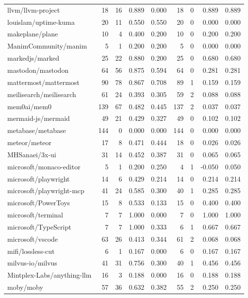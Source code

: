 \begin{tabular}{lrrrrrrrr}
llvm/llvm-project & 18 & 16 & 0.889 & 0.000 & 18 & 0 & 0.889 & 0.889 \\
louislam/uptime-kuma & 20 & 11 & 0.550 & 0.550 & 20 & 0 & 0.000 & 0.000 \\
makeplane/plane & 10 & 4 & 0.400 & 0.200 & 10 & 0 & 0.200 & 0.200 \\
ManimCommunity/manim & 5 & 1 & 0.200 & 0.200 & 5 & 0 & 0.000 & 0.000 \\
markedjs/marked & 25 & 22 & 0.880 & 0.200 & 25 & 0 & 0.680 & 0.680 \\
mastodon/mastodon & 64 & 56 & 0.875 & 0.594 & 64 & 0 & 0.281 & 0.281 \\
mattermost/mattermost & 90 & 78 & 0.867 & 0.708 & 89 & 1 & 0.159 & 0.159 \\
meilisearch/meilisearch & 61 & 24 & 0.393 & 0.305 & 59 & 2 & 0.088 & 0.088 \\
mem0ai/mem0 & 139 & 67 & 0.482 & 0.445 & 137 & 2 & 0.037 & 0.037 \\
mermaid-js/mermaid & 49 & 21 & 0.429 & 0.327 & 49 & 0 & 0.102 & 0.102 \\
metabase/metabase & 144 & 0 & 0.000 & 0.000 & 144 & 0 & 0.000 & 0.000 \\
meteor/meteor & 17 & 8 & 0.471 & 0.444 & 18 & 0 & 0.026 & 0.026 \\
MHSanaei/3x-ui & 31 & 14 & 0.452 & 0.387 & 31 & 0 & 0.065 & 0.065 \\
microsoft/monaco-editor & 5 & 1 & 0.200 & 0.250 & 4 & 1 & -0.050 & 0.050 \\
microsoft/playwright & 14 & 6 & 0.429 & 0.214 & 14 & 0 & 0.214 & 0.214 \\
microsoft/playwright-mcp & 41 & 24 & 0.585 & 0.300 & 40 & 1 & 0.285 & 0.285 \\
microsoft/PowerToys & 15 & 8 & 0.533 & 0.133 & 15 & 0 & 0.400 & 0.400 \\
microsoft/terminal & 7 & 7 & 1.000 & 0.000 & 7 & 0 & 1.000 & 1.000 \\
microsoft/TypeScript & 7 & 7 & 1.000 & 0.333 & 6 & 1 & 0.667 & 0.667 \\
microsoft/vscode & 63 & 26 & 0.413 & 0.344 & 61 & 2 & 0.068 & 0.068 \\
mifi/lossless-cut & 6 & 1 & 0.167 & 0.000 & 6 & 0 & 0.167 & 0.167 \\
milvus-io/milvus & 41 & 31 & 0.756 & 0.300 & 40 & 1 & 0.456 & 0.456 \\
Mintplex-Labs/anything-llm & 16 & 3 & 0.188 & 0.000 & 16 & 0 & 0.188 & 0.188 \\
moby/moby & 57 & 36 & 0.632 & 0.382 & 55 & 2 & 0.250 & 0.250 \\

\end{tabular}
